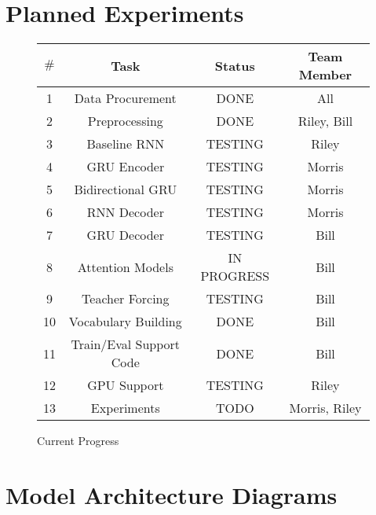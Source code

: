 \documentclass[twoside,twocolumn]{article}
\begin{document}
\section{Planned Experiments}
\begin{figure*}[ht]
    \centering
    \begin{tabular}{ |c|c|c|c| }
        \hline
        $\#$
          & \textbf{Task}
          & \textbf{Status}
          & \textbf{Team Member}\\
        \hline
        1 & Data Procurement & DONE & All \\ \hline
        2 & Preprocessing & DONE & Riley, Bill \\ \hline
        3 & Baseline RNN & TESTING & Riley \\ \hline
        4 & GRU Encoder & TESTING & Morris \\ \hline
        5 & Bidirectional GRU & TESTING & Morris \\ \hline
        6 & RNN Decoder & TESTING & Morris \\ \hline
        7 & GRU Decoder & TESTING & Bill \\ \hline
        8 & Attention Models & IN PROGRESS & Bill \\ \hline
        9 & Teacher Forcing & TESTING & Bill \\ \hline
        10 & Vocabulary Building & DONE & Bill \\ \hline
        11 & Train/Eval Support Code & DONE & Bill \\ \hline
        12 & GPU Support & TESTING & Riley \\ \hline
        13 & Experiments & TODO & Morris, Riley \\ \hline
    \end{tabular}

    \caption{Current Progress}
    \label{fig:current-status}
\end{figure*}






\clearpage
\appendix
\onecolumn
\section{Model Architecture Diagrams}
\end{document}
